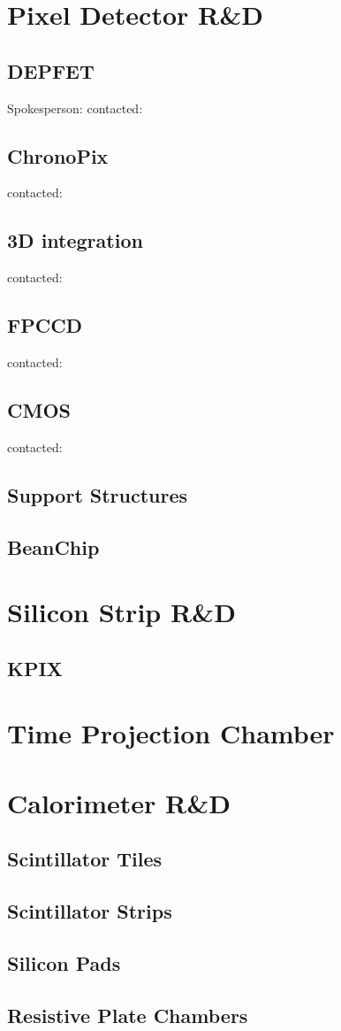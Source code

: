 \documentclass[11pt]{article}
\begin{document}
\section{Pixel Detector R\&D}
\subsection{DEPFET}
Spokesperson: contacted: 
\subsection{ChronoPix}
contacted:
\subsection{3D integration}
contacted:
\subsection{FPCCD}
contacted:
\subsection{CMOS}
contacted:
\subsection{Support Structures}
\subsection{BeanChip}
\section{Silicon Strip R\&D}
\subsection{KPIX}
\section{Time Projection Chamber}
\section{Calorimeter R\&D}
\subsection{Scintillator Tiles}
\subsection{Scintillator Strips}
\subsection{Silicon Pads}
\subsection{Resistive Plate Chambers}
\end{document}
